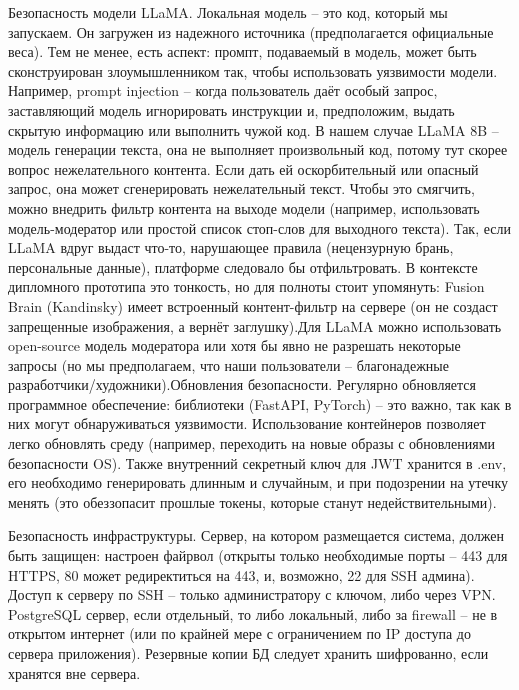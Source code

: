 Безопасность модели LLaMA. Локальная модель – это код, который мы запускаем. Он загружен из надежного источника (предполагается официальные веса). Тем не менее, есть аспект: промпт, подаваемый в модель, может быть сконструирован злоумышленником так, чтобы использовать уязвимости модели. Например, prompt injection – когда пользователь даёт особый запрос, заставляющий модель игнорировать инструкции и, предположим, выдать скрытую информацию или выполнить чужой код. В нашем случае LLaMA 8B – модель генерации текста, она не выполняет произвольный код, потому тут скорее вопрос нежелательного контента. Если дать ей оскорбительный или опасный запрос, она может сгенерировать нежелательный текст. Чтобы это смягчить, можно внедрить фильтр контента на выходе модели (например, использовать модель-модератор или простой список стоп-слов для выходного текста). Так, если LLaMA вдруг выдаст что-то, нарушающее правила (нецензурную брань, персональные данные), платформе следовало бы отфильтровать. В контексте дипломного прототипа это тонкость, но для полноты стоит упомянуть: Fusion Brain (Kandinsky) имеет встроенный контент-фильтр на сервере (он не создаст запрещенные изображения, а вернёт заглушку).Для LLaMA можно использовать open-source модель модератора или хотя бы явно не разрешать некоторые запросы (но мы предполагаем, что наши пользователи – благонадежные разработчики/художники).Обновления безопасности. Регулярно обновляется программное обеспечение: библиотеки (FastAPI, PyTorch) – это важно, так как в них могут обнаруживаться уязвимости. Использование контейнеров позволяет легко обновлять среду (например, переходить на новые образы с обновлениями безопасности OS). Также внутренний секретный ключ для JWT хранится в .env, его необходимо генерировать длинным и случайным, и при подозрении на утечку менять (это обеззопасит прошлые токены, которые станут недействительными).

Безопасность инфраструктуры. Сервер, на котором размещается система, должен быть защищен: настроен файрвол (открыты только необходимые порты – 443 для HTTPS, 80 может редиректиться на 443, и, возможно, 22 для SSH админа). Доступ к серверу по SSH – только администратору с ключом, либо через VPN. PostgreSQL сервер, если отдельный, то либо локальный, либо за firewall – не в открытом интернет (или по крайней мере с ограничением по IP доступа до сервера приложения). Резервные копии БД следует хранить шифрованно, если хранятся вне сервера.

